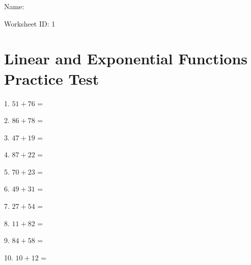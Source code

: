 \documentclass[12pt]{article}
\begin{document}
\begin{flushright}
Name: \underline{\hspace{2.5 in}}
\end{flushright}
\begin{flushright}
Worksheet ID: 1
\end{flushright}
\section*{Linear and Exponential Functions Practice Test}




1. $51 + 76$ = \underline{\hspace{2 in}}




2. $86 + 78$ = \underline{\hspace{2 in}}




3. $47 + 19$ = \underline{\hspace{2 in}}




4. $87 + 22$ = \underline{\hspace{2 in}}




5. $70 + 23$ = \underline{\hspace{2 in}}




6. $49 + 31$ = \underline{\hspace{2 in}}




7. $27 + 54$ = \underline{\hspace{2 in}}




8. $11 + 82$ = \underline{\hspace{2 in}}




9. $84 + 58$ = \underline{\hspace{2 in}}




10. $10 + 12$ = \underline{\hspace{2 in}}
\end{document}
